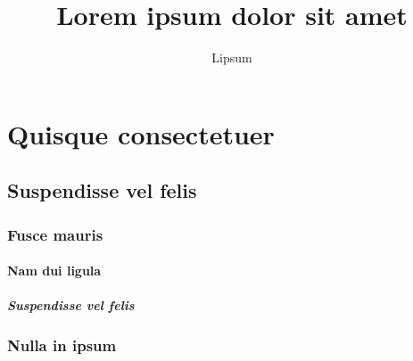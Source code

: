 \documentclass{scrreprt}
\author{Lipsum}
\title{Lorem ipsum dolor sit amet}
\begin{document}

\maketitle

\begin{abstract}
\lipsum[23]
\end{abstract}

\tableofcontents

\part{Quisque consectetuer}

\chapter{Suspendisse vel felis}
\lipsum[42]
\section{Fusce mauris}
\lipsum[6]
\lipsum[7]

\subsection{Nam dui ligula}
\lipsum[56]
\lipsum[57]
\lipsum[58]

\subsubsection{Suspendisse vel felis}
\lipsum[12]
\lipsum[13]

\section{Nulla in ipsum}
\lipsum[14]
\lipsum[15]
\end{document}
